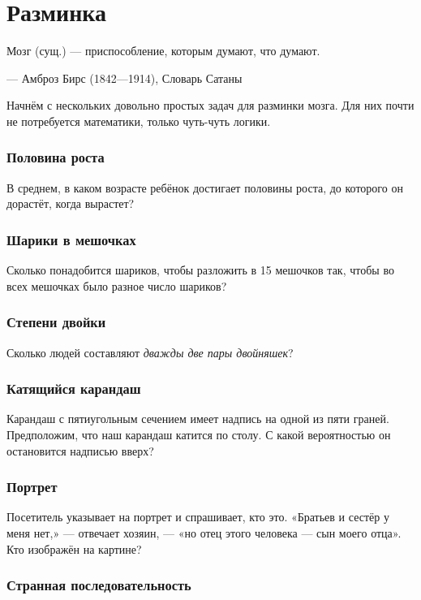 \chapter{Разминка}


\setlength{\epigraphwidth}{.80\textwidth}
\epigraph{Мозг (сущ.) --- приспособление, которым думают, что думают.}{--- Амброз Бирс (1842---1914), Словарь Сатаны}

Начнём с нескольких довольно простых задач для разминки мозга.
Для них почти не потребуется математики, только чуть-чуть логики.

\subsection*{Половина роста}

В среднем, в каком возрасте ребёнок достигает половины роста, до которого он дорастёт, когда вырастет?

\subsection*{Шарики в мешочках}

Сколько понадобится шариков, чтобы разложить в 15 мешочков так,
чтобы во всех мешочках было разное число шариков?

\subsection*{Степени двойки}

Сколько людей составляют \emph{дважды две пары двойняшек}?

\subsection*{Катящийся карандаш}

Карандаш с пятиугольным сечением имеет надпись на одной из пяти граней.
Предположим, что наш карандаш катится по столу.
С какой вероятностью он остановится надписью вверх?

\subsection*{Портрет}

Посетитель указывает на портрет и спрашивает, кто это. 
«Братьев и сестёр у меня нет,» --- отвечает хозяин, --- «но отец этого человека --- сын моего отца».
Кто изображён на картине?

\subsection*{Странная последовательность}

